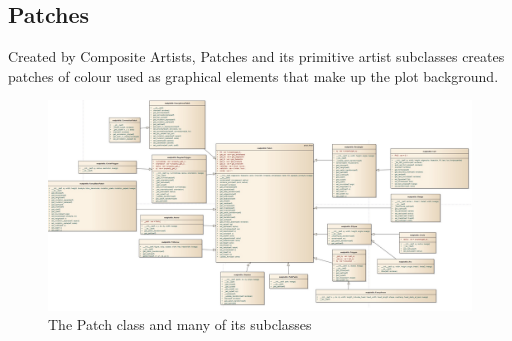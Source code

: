 \documentclass[pdftex,10pt,a4paper]{report}
\begin{document}
\subsection{Patches}
Created by Composite Artists, Patches and its primitive artist subclasses creates patches of colour used as graphical elements that make up the plot background.
\begin{figure}[ht!]
        \centering
                \includegraphics[width=\textwidth]{img/umls/derek/patch}
        \caption{The Patch class and many of its subclasses}
\end{figure}



\end{document}
